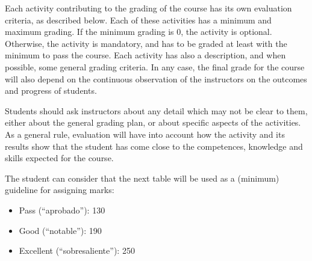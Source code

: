 \documentclass[a4paper]{article}
\begin{document}
Each activity contributing to the grading of the course has its own evaluation criteria, as described below. Each of these activities has a minimum and maximum grading. If the minimum grading is 0, the activity is optional. Otherwise, the activity is mandatory, and has to be graded at least with the minimum to pass the course. Each activity has also a description, and when possible, some general grading criteria. In any case, the final grade for the course will also depend on the continuous observation of the instructors on the outcomes and progress of students.

Students should ask instructors about any detail which may not be clear to them, either about the general grading plan, or about specific aspects of the activities. As a general rule, evaluation will have into account how the activity and its results show that the student has come close to the competences, knowledge and skills expected for the course.

The student can consider that the next table will be used as a (minimum) guideline for assigning marks:

\begin{itemize}
\item Pass (``aprobado''): 130
\item Good (``notable''): 190
\item Excellent (``sobresaliente''): 250
\end{itemize}
\end{document}
